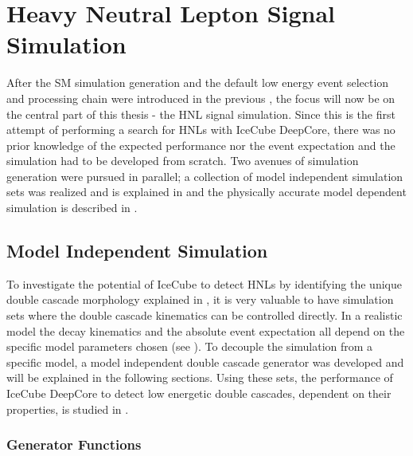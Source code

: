 \setchapterpreamble[u]{\margintoc}

\chapter{Heavy Neutral Lepton Signal Simulation}

After the SM simulation generation and the default low energy event selection and processing chain were introduced in the previous , the focus will now be on the central part of this thesis - the HNL signal simulation. Since this is the first attempt of performing a search for HNLs with IceCube DeepCore, there was no prior knowledge of the expected performance nor the event expectation and the simulation had to be developed from scratch. Two avenues of simulation generation were pursued in parallel; a collection of model independent simulation sets was realized and is explained in  and the physically accurate model dependent simulation is described in .


\section{Model Independent Simulation} 

To investigate the potential of IceCube to detect HNLs by identifying the unique double cascade morphology explained in , it is very valuable to have simulation sets where the double cascade kinematics can be controlled directly. In a realistic model the decay kinematics and the absolute event expectation all depend on the specific model parameters chosen (see ). To decouple the simulation from a specific model, a model independent double cascade generator was developed and will be explained in the following sections. Using these sets, the performance of IceCube DeepCore to detect low energetic double cascades, dependent on their properties, is studied in . 


\subsection{Generator Functions}


